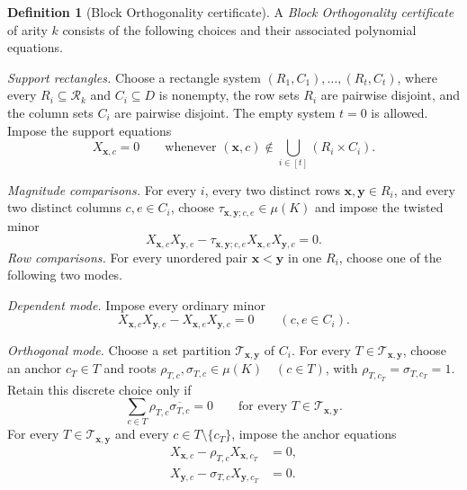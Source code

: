 \documentclass[11pt,letterpaper,onecolumn]{article}
\theoremstyle{plain}
\theoremstyle{definition}
\newtheorem{definition}[definition]{Definition}
\theoremstyle{remark}
\begin{document}
\begin{definition}[Block Orthogonality certificate]
\label{def:bo-certificate}
A \emph{Block Orthogonality certificate} of arity $k$ consists of the
following choices and their associated polynomial equations.

\emph{Support rectangles.}
Choose a rectangle system $(R_1,C_1),\ldots,(R_t,C_t)$, where every
$R_i\subseteq\mathcal R_k$ and $C_i\subseteq D$ is nonempty,
the row sets $R_i$ are pairwise disjoint, and the column sets $C_i$ are
pairwise disjoint.  The empty system $t=0$ is allowed.  Impose the support
equations
\begin{equation}
  X_{\mathbf x,c}=0
  \qquad
  \text{whenever }
  (\mathbf x,c)\notin
  \bigcup_{i\in[t]}(R_i\times C_i).
  \label{eq:bo-certificate-support}
\end{equation}

\emph{Magnitude comparisons.}
For every $i$, every two distinct rows
$\mathbf x,\mathbf y\in R_i$, and every two distinct columns
$c,e\in C_i$, choose
$\tau_{\mathbf x,\mathbf y;c,e}\in\mu(K)$ and impose the twisted minor
\begin{equation}
  X_{\mathbf x,c}X_{\mathbf y,e}
  -\tau_{\mathbf x,\mathbf y;c,e}
   X_{\mathbf x,e}X_{\mathbf y,c}=0.
  \label{eq:bo-certificate-twisted-minor}
\end{equation}
\emph{Row comparisons.}
For every unordered pair $\mathbf x<\mathbf y$ in one $R_i$, choose one of
the following two modes.

\emph{Dependent mode.}
Impose every ordinary minor
\begin{equation}
  X_{\mathbf x,c}X_{\mathbf y,e}
  -X_{\mathbf x,e}X_{\mathbf y,c}=0
  \qquad(c,e\in C_i).
  \label{eq:bo-certificate-dependent}
\end{equation}

\emph{Orthogonal mode.}
Choose a set partition $\mathcal T_{\mathbf x,\mathbf y}$ of $C_i$.  For
every $T\in\mathcal T_{\mathbf x,\mathbf y}$, choose an anchor $c_T\in T$
and roots $\rho_{T,c},\sigma_{T,c}\in\mu(K) \quad(c\in T)$, with $\rho_{T,c_T}=\sigma_{T,c_T}=1$.  Retain this discrete choice only if
\begin{equation}
  \sum_{c\in T}\rho_{T,c}\overline{\sigma_{T,c}}=0
  \qquad
  \text{for every }T\in\mathcal T_{\mathbf x,\mathbf y}.
  \label{eq:bo-certificate-root-sum}
\end{equation}
For every $T\in\mathcal T_{\mathbf x,\mathbf y}$ and every
$c\in T\setminus\{c_T\}$, impose the anchor equations
\begin{align}
  X_{\mathbf x,c}-\rho_{T,c}X_{\mathbf x,c_T}&=0,
  \label{eq:bo-certificate-first-anchor}\\
  X_{\mathbf y,c}-\sigma_{T,c}X_{\mathbf y,c_T}&=0.
  \label{eq:bo-certificate-second-anchor}
\end{align}


\end{definition}
\end{document}
